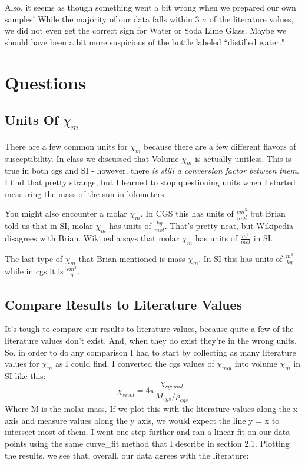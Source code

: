 \documentclass{article}
\begin{document}
Also, it seems as though something went a bit wrong when we prepared our own
samples! While the majority of our data falls within 3 $\sigma$ of the
literature values, we did not even get the correct sign for Water or Soda Lime
Glass. Maybe we should have been a bit more suspicious of the bottle labeled
``distilled water."



\section{Questions}
\subsection{Units Of $\chi_m$}

There are a few common units for $\chi_m$ because there are a few different
flavors of susceptibility. In class we discussed that Volume $\chi_m$ is
actually unitless. This is true in both cgs and SI - however, there \textit{is
    still a conversion factor between them}. I find that pretty strange, but I
learned to stop questioning units when I started measuring the mass of the sun
in kilometers.

You might also encounter a molar $\chi_m$. In CGS this has units of
$\frac{cm^3}{mol}$ but Brian told us that in SI, molar $\chi_m$ has units of
$\frac{kg}{mol}$. That's pretty neat, but Wikipedia disagrees with Brian.
Wikipedia says that molar $\chi_m$ has units of $\frac{m^3}{mol}$ in SI.

The last type of $\chi_m$ that Brian mentioned is mass $\chi_m$. In SI this has
units of $\frac{m^3}{kg}$ while in cgs it is $\frac{cm^3}{g}$.

\subsection{Compare Results to Literature Values}
It's tough to compare our results to literature values, because quite a few of
the literature values don't exist. And, when they do exist they're in the wrong
units. So, in order to do any comparison I had to start by collecting as many
literature values for $\chi_m$ as I could find. I converted the cgs values of
$\chi_{mol}$ into volume $\chi_m$ in SI like this:
$$\chi_{sivol} = 4 \pi\frac{\chi_{cgsmol}}{M_{cgs} / \rho_{cgs}} $$
Where M is the molar mass. If we plot this with the literature values along the
x axis and measure values along the y axis, we would expect the line y = x to
intersect most of them. I went one step further and ran a linear fit on our
data points using the same curve\_fit method that I describe in section 2.1.
Plotting the results, we see that, overall, our data agrees with the
literature:
\end{document}
